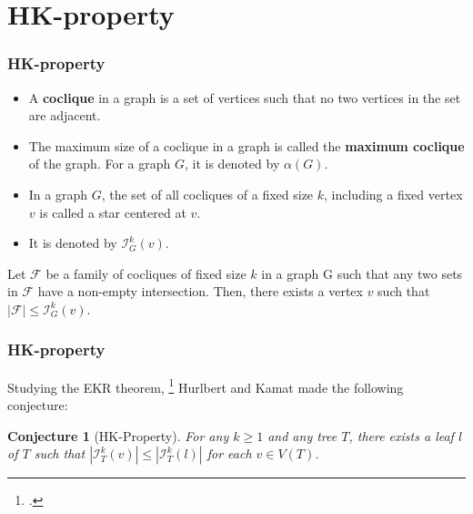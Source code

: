 \documentclass[10pt,]{beamer}
\theoremstyle{conjectureStyle}
\newtheorem*{conjecture}{Conjecture}
\theoremstyle{notationStyle}
\theoremstyle{claimStyle}
\begin{document}
\section{HK-property}
\begin{frame}\frametitle{HK-property}
    \begin{definition}[Cocliques]
        \begin{itemize}
            \item A \textbf{coclique} in a graph is a set of vertices such that no two vertices in the set are adjacent.
            \item The maximum size of a coclique in a graph is called the \textbf{maximum coclique} of the graph. For a graph $G$, it is denoted by $\alpha(G)$.
        \end{itemize}
    \end{definition}
    \pause

    \begin{definition}
        \begin{itemize}
            \item In a graph $G$, the set of all cocliques of a fixed size $k$, including a fixed vertex $v$ is called a star centered at $v$.
            \item It is denoted by $\mathcal{I}^k_G(v)$.
        \end{itemize}
    \end{definition}
    \pause

    \begin{definition}
        Let $\mathcal{F}$ be a family of cocliques of fixed size $k$ in a graph G such that any two sets in $\mathcal{F}$ have a non-empty intersection. Then, there exists a vertex $v$ such that $|\mathcal{F}| \leq \mathcal{I}^k_G(v)$.
    \end{definition}
\end{frame}

\begin{frame}\frametitle{HK-property}
    Studying the EKR theorem, \footcite{MR2763040} Hurlbert and Kamat made the following conjecture:
    \begin{conjecture}[HK-Property]
        For any $k \geq 1$ and any tree $T$, there exists a leaf $l$ of $T$ such that $|\mathcal{I}^k_T(v)| \leq |\mathcal{I}^k_T(l)|$ for each $v \in V(T)$.
    \end{conjecture}
\end{frame}
\end{document}
